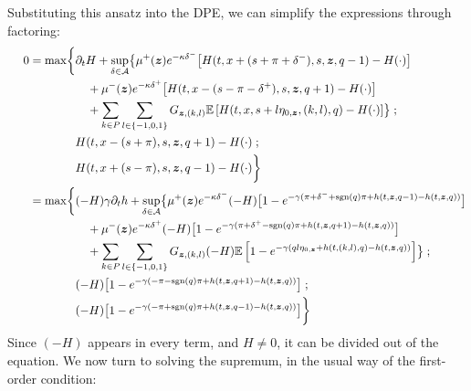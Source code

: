 Substituting this ansatz into the DPE, we can simplify the expressions through factoring:
\begin{align*}
0 = \max \biggl\lbrace & \partial_t H + \sup \limits_{\delta \in \cA} \bigl\lbrace \mu^+(\bz) e^{ -\kappa \delta^{-}} \bigl[ H(t,x+(s+\pi+\delta^-),s,\bz,q-1) - H(\cdot) \bigr] \\
& \quad + \mu^-(\bz) e^{ -\kappa \delta^{+}} \bigl[ H(t,x-(s-\pi-\delta^+),s,\bz,q+1) - H(\cdot) \bigr] \\
& \quad + \sum_{k\in P} \sum_{l \in \{-1,0,1\}} G_{\bz,(k,l)} \E \left[ H(t,x,s+l\eta_{0,\bz},(k,l),q) - H(\cdot) \right] \bigr\rbrace \; ; \\
& H(t,x-(s+\pi), s, \bz, q+1) - H(\cdot) \; ; \\
&  H(t,x+(s-\pi), s, \bz, q-1) - H(\cdot) \biggr\rbrace \\
\phantom{0 {}={}} = \max \biggl\lbrace & (-H)\gamma \partial_t h + \sup \limits_{\delta \in \cA} \bigl\lbrace \mu^+(\bz) e^{ -\kappa \delta^{-}} (-H) \bigl[ 1 - e^{-\gamma(\pi + \delta^- + \sgn(q)\pi + h(t,\bz,q-1) - h(t,\bz,q))} \bigr] \\
& \quad + \mu^-(\bz) e^{ -\kappa \delta^{+}} (-H) \bigl[ 1 - e^{-\gamma(\pi + \delta^+ - \sgn(q)\pi + h(t,\bz,q+1) - h(t,\bz,q))} \bigr] \\
& \quad + \sum_{k\in P} \sum_{l \in \{-1,0,1\}} G_{\bz,(k,l)} (-H) \E \left[ 1 - e^{-\gamma(ql\eta_{0,\bz} + h(t,(k,l),q) - h(t,\bz,q))} \right] \bigr\rbrace \; ; \\
& (-H) \bigl[ 1- e^{-\gamma(-\pi - \sgn(q)\pi + h(t,\bz,q+1) - h(t,\bz,q)) } \bigr] \; ; \\
&  (-H) \bigl[ 1- e^{-\gamma(-\pi + \sgn(q)\pi + h(t,\bz,q-1) - h(t,\bz,q)) } \bigr] \biggr\rbrace
\end{align*}
Since $(-H)$ appears in every term, and $H \neq 0$, it can be divided out of the equation. We now turn to solving the supremum, in the usual way of the first-order condition:
